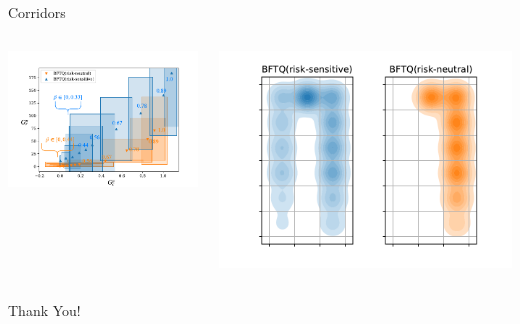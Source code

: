 \documentclass[slideopt,A4,showboxes,svgnames]{beamer}
\begin{document}
\begin{frame}{Corridors}

\begin{columns}
\begin{column}{0.5\linewidth}
\includegraphics[trim={0.5cm 0.1cm 0.7cm 0.2cm}, clip, page=1, width=\linewidth]{../../source/img/corridors}
\end{column}
\begin{column}{0.46\linewidth}
\begin{center}
\href{https://budgeted-rl.github.io/\#risk-sensitive-exploration}{\includegraphics[trim={2cm 0.1cm 1cm 0.5cm}, clip, width=\linewidth]{../../source/img/corridors_densities.pdf}}
\end{center}
\end{column}
\end{columns}
\end{frame}

\begin{frame}
\centering \LARGE Thank You!
\end{frame}
\end{document}
